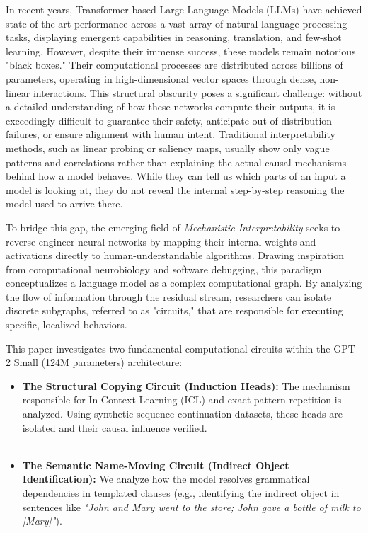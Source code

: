 \documentclass[11pt]{article}
\begin{document}
In recent years, Transformer-based Large Language Models (LLMs) have achieved state-of-the-art performance across a vast array of natural language processing tasks, displaying emergent capabilities in reasoning, translation, and few-shot learning. However, despite their immense success, these models remain notorious "black boxes." Their computational processes are distributed across billions of parameters, operating in high-dimensional vector spaces through dense, non-linear interactions. This structural obscurity poses a significant challenge: without a detailed understanding of how these networks compute their outputs, it is exceedingly difficult to guarantee their safety, anticipate out-of-distribution failures, or ensure alignment with human intent. Traditional interpretability methods, such as linear probing or saliency maps, usually show only vague patterns and correlations rather than explaining the actual causal mechanisms behind how a model behaves. While they can tell us which parts of an input a model is looking at, they do not reveal the internal step-by-step reasoning the model used to arrive there.

To bridge this gap, the emerging field of \textit{Mechanistic Interpretability} seeks to reverse-engineer neural networks by mapping their internal weights and activations directly to human-understandable algorithms. Drawing inspiration from computational neurobiology and software debugging, this paradigm conceptualizes a language model as a complex computational graph. By analyzing the flow of information through the residual stream, researchers can isolate discrete subgraphs, referred to as "circuits," that are responsible for executing specific, localized behaviors.

This paper investigates two fundamental computational circuits within the GPT-2 Small (124M parameters) architecture:
\begin{itemize}
    \item \textbf{The Structural Copying Circuit (Induction Heads):} The mechanism responsible for In-Context Learning (ICL) and exact pattern repetition is analyzed. Using synthetic sequence continuation datasets, these heads are isolated and their causal influence verified.
    \\\
    \item \textbf{The Semantic Name-Moving Circuit (Indirect Object Identification):} We analyze how the model resolves grammatical dependencies in templated clauses (e.g., identifying the indirect object in sentences like \textit{"John and Mary went to the store; John gave a bottle of milk to [Mary]"}).
\end{itemize}
\end{document}
